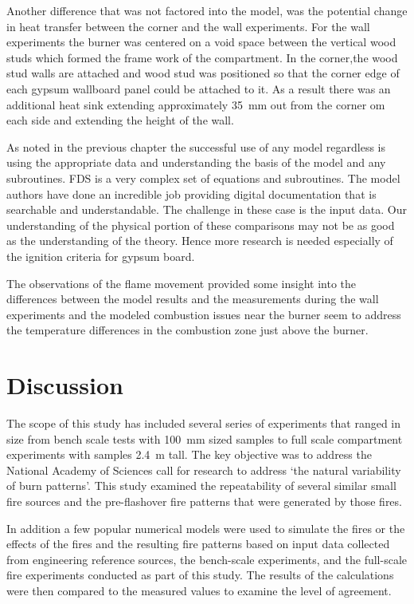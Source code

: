 \documentclass[twoside]{uocthesis}
\begin{document}
{Another difference that was not factored into the model, was the potential change in heat transfer between the corner and the wall experiments.  For the wall experiments the burner was centered on a void space between the vertical wood studs which formed the frame work of the compartment.  In the corner,the wood stud walls are attached and wood stud was positioned so that the corner edge of each gypsum wallboard panel could be attached to it.  As a result there was an additional heat sink extending approximately 35~mm out from the corner om each side and extending the height of the wall.

As noted in the previous chapter the successful use of any model regardless is using the appropriate data and understanding the basis of the model and any subroutines.  FDS is a very complex set of equations and subroutines.  The model authors have done an incredible job providing digital documentation that is searchable and understandable.  The challenge in these case is the input data.  Our understanding of the physical portion of these comparisons may not be as good as the understanding of the theory. Hence more research is needed especially of the ignition criteria for gypsum board. 

The observations of the flame movement provided some insight into the differences between the model results and the measurements during the wall experiments and the modeled combustion issues near the burner seem to address the temperature differences in the combustion zone just above the burner.    

\chapter{Discussion}

The scope of this study has included several series of experiments that ranged in size from bench scale tests with 100~mm sized samples to full scale compartment experiments with samples 2.4~m tall. The key objective was to address the National Academy of Sciences call for research to address `the natural variability of burn patterns'. This study examined the repeatability of several similar small fire sources and the pre-flashover fire patterns that were generated by those fires. 

In addition a few popular numerical models were used to simulate the fires or the effects of the fires and the resulting fire patterns based on input data collected from engineering reference sources, the bench-scale experiments, and the full-scale fire experiments conducted as part of this study.  The results of the calculations were then compared to the measured values to examine the level of agreement.  

}
\end{document}
